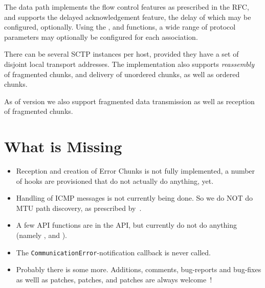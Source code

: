 \documentclass[10pt]{article}
\begin{document}
The data path implements the flow control features as prescribed in the RFC,
and supports the delayed acknowledgement feature, the delay of which may be configured,
optionally.
Using the ,  and
 functions, a wide range of protocol parameters
may optionally be configured for each association.

There can be several SCTP instances per host, provided they have a set of
disjoint local transport addresses.
The implementation also supports \emph{reassembly} of fragmented chunks, and
delivery of unordered chunks, as well as ordered chunks.

As of version  we also support fragmented data
transmission as well as reception of fragmented chunks.

\section{What is Missing}
\begin{itemize}
\item Reception and creation of Error Chunks is not fully implemented, a number 
of hooks are provisioned that do not actually do anything, yet.
\item Handling of ICMP messages is not currently being done. So we do NOT do MTU
path discovery, as prescribed by~\cite{RFC2960}.
\item A few API functions are in the API, but currently do not do anything
(namely  ,  and
).
\item The \texttt{CommunicationError}-notification callback is never
called.
\item Probably there is some more. Additions, comments, bug-reports and
bug-fixes as welll as patches, patches, and patches are always welcome~!
\end{itemize}
\end{document}
